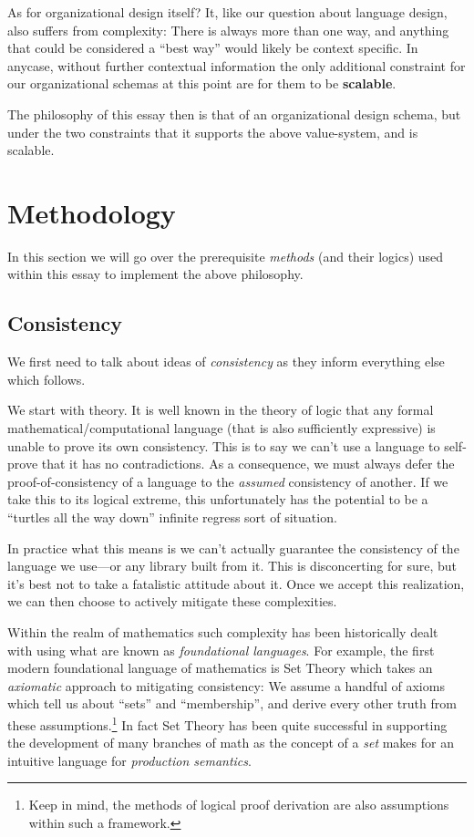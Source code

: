 \documentclass[twoside]{article}
\newcommand{\strong}[1]{{\bfseries #1}}
\begin{document}
As for organizational design itself? It, like our question about language design, also suffers from complexity: There is
always more than one way, and anything that could be considered a ``best way'' would likely be context specific. In anycase,
without further contextual information the only additional constraint for our organizational schemas at this point are for
them to be \strong{scalable}.

The philosophy of this essay then is that of an organizational design schema, but under the two constraints that
it supports the above value-system, and is scalable.

\section*{Methodology}

In this section we will go over the prerequisite \emph{methods} (and their logics) used within this essay
to implement the above philosophy.

\subsection*{Consistency}

We first need to talk about ideas of \emph{consistency} as they inform everything else which follows.

We start with theory. It is well known in the theory of logic that any formal mathematical/computational language
(that is also sufficiently expressive) is unable to prove its own consistency. This is to say we can't use a language
to self-prove that it has no contradictions. As a consequence, we must always defer the proof-of-consistency of a language
to the \emph{assumed} consistency of another. If we take this to its logical extreme, this unfortunately has the
potential to be a ``turtles all the way down'' infinite regress sort of situation.

In practice what this means is we can't actually guarantee the consistency of the language we use---or any library
built from it. This is disconcerting for sure, but it's best not to take a fatalistic attitude about it.
Once we accept this realization, we can then choose to actively mitigate these complexities.

Within the realm of mathematics such complexity has been historically dealt with using what are known as
\emph{foundational languages}. For example, the first modern foundational language of mathematics is Set Theory
which takes an \emph{axiomatic} approach to mitigating consistency: We assume a handful of axioms which tell us
about ``sets'' and ``membership'', and derive every other truth from these assumptions.\footnote{Keep in mind,
the methods of logical proof derivation are also assumptions within such a framework.} In fact Set Theory has
been quite successful in supporting the development of many branches of math as the concept of a \emph{set}
makes for an intuitive language for \emph{production semantics}.
\end{document}
